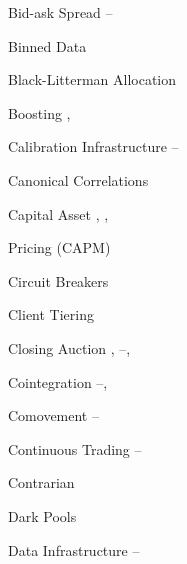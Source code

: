 \begin{multicols}{2}
{Bid-ask Spread \hfill \pageref{in:bidask1}--\pageref{in:bidask2} \par

Binned Data \hfill \pageref{in:binned_data} \par

Black-Litterman Allocation \hfill \pageref{in:allo} \par

Boosting \hfill \pageref{in:boost1}, \pageref{in:boost2} \par

Calibration Infrastructure \hfill \pageref{in:calb1}--\pageref{in:calb2} \par

Canonical Correlations \hfill \pageref{in:cancor1} \par%

Capital Asset \hfill \pageref{in:capm1}, \pageref{in:capm2}, \pageref{in:capm3} \par \hspace{0.25cm} Pricing (CAPM) \par

Circuit Breakers \hfill \pageref{in:circ_br} \par

Client Tiering \hfill \pageref{in:client_t1}\par%

Closing Auction \hfill \pageref{in:close1}, \pageref{in:close2}--\pageref{in:close3}, \pageref{in:close4} \par

Cointegration \hfill \pageref{in:coint1}--\pageref{in:coint2}, \pageref{in:coint3} \par

Comovement \hfill \pageref{in:comove1}--\pageref{in:comove2} \par

Continuous Trading \hfill \pageref{in:cont_trade1}--\pageref{in:cont_trade2} \par

Contrarian \hfill \pageref{in:contrary} \par

Dark Pools \hfill \pageref{in:dark} \par

Data Infrastructure \hfill \pageref{in:dat_infr1}--\pageref{in:dat_infr2} \par

}
\end{multicols}
